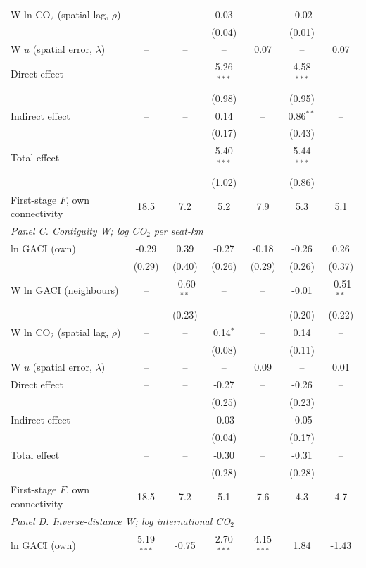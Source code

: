 \documentclass[12pt]{extarticle}
\begin{document}
\begin{table}[H]
{\begin{threeparttable}
\begin{tabular}{lcccccc}
  W ln CO$_2$ (spatial lag, $\rho$) & -- & -- & 0.03 & -- & -0.02 & -- \\
   &  &  & (0.04) &  & (0.01) &  \\
  W $u$ (spatial error, $\lambda$) & -- & -- & -- & 0.07 & -- & 0.07 \\
  Direct effect & -- & -- & 5.26$^{***}$ & -- & 4.58$^{***}$ & -- \\
   &  &  & (0.98) &  & (0.95) &  \\
  Indirect effect & -- & -- & 0.14 & -- & 0.86$^{**}$ & -- \\
   &  &  & (0.17) &  & (0.43) &  \\
  Total effect & -- & -- & 5.40$^{***}$ & -- & 5.44$^{***}$ & -- \\
   &  &  & (1.02) &  & (0.86) &  \\
  First-stage $F$, own connectivity & 18.5 & 7.2 & 5.2 & 7.9 & 5.3 & 5.1 \\
\midrule
\multicolumn{7}{l}{\textit{Panel C. Contiguity W; log CO$_2$ per seat-km}} \\
  ln GACI (own) & -0.29 & 0.39 & -0.27 & -0.18 & -0.26 & 0.26 \\
   & (0.29) & (0.40) & (0.26) & (0.29) & (0.26) & (0.37) \\
  W ln GACI (neighbours) & -- & -0.60$^{**}$ & -- & -- & -0.01 & -0.51$^{**}$ \\
   &  & (0.23) &  &  & (0.20) & (0.22) \\
  W ln CO$_2$ (spatial lag, $\rho$) & -- & -- & 0.14$^{*}$ & -- & 0.14 & -- \\
   &  &  & (0.08) &  & (0.11) &  \\
  W $u$ (spatial error, $\lambda$) & -- & -- & -- & 0.09 & -- & 0.01 \\
  Direct effect & -- & -- & -0.27 & -- & -0.26 & -- \\
   &  &  & (0.25) &  & (0.23) &  \\
  Indirect effect & -- & -- & -0.03 & -- & -0.05 & -- \\
   &  &  & (0.04) &  & (0.17) &  \\
  Total effect & -- & -- & -0.30 & -- & -0.31 & -- \\
   &  &  & (0.28) &  & (0.28) &  \\
  First-stage $F$, own connectivity & 18.5 & 7.2 & 5.1 & 7.6 & 4.3 & 4.7 \\
\midrule
\multicolumn{7}{l}{\textit{Panel D. Inverse-distance W; log international CO$_2$}} \\
  ln GACI (own) & 5.19$^{***}$ & -0.75 & 2.70$^{***}$ & 4.15$^{***}$ & 1.84 & -1.43 \\

\end{tabular}
\end{threeparttable}}
\end{table}
\end{document}
